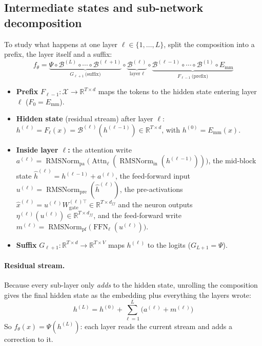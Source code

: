 \documentclass[10pt,a4paper]{article}
\newcommand{\op}[1]{\operatorname{#1}}
\theoremstyle{definition}
\begin{document}
\subsection{Intermediate states and sub-network decomposition}
To study what happens at one layer $\ell\in\{1,\dots,L\}$, split the composition into a prefix, the layer itself and a suffix:
\begin{equation}
  f_\theta = \underbrace{\Psi\circ\mathcal{B}^{(L)}\circ\cdots\circ\mathcal{B}^{(\ell+1)}}_{G_{\ell+1}\ \text{(suffix)}}\circ\underbrace{\mathcal{B}^{(\ell)}}_{\text{layer }\ell}\circ\underbrace{\mathcal{B}^{(\ell-1)}\circ\cdots\circ\mathcal{B}^{(1)}\circ E_{\mathrm{mm}}}_{F_{\ell-1}\ \text{(prefix)}}
\end{equation}
\begin{itemize}
\item \textbf{Prefix} $F_{\ell-1}:\mathcal{X}\to\mathbb{R}^{T\times d}$ maps the tokens to the hidden state entering layer $\ell$ ($F_0=E_{\mathrm{mm}}$).
\item \textbf{Hidden state} (residual stream) after layer $\ell$: $h^{(\ell)}=F_\ell(x)=\mathcal{B}^{(\ell)}(h^{(\ell-1)})\in\mathbb{R}^{T\times d}$, with $h^{(0)}=E_{\mathrm{mm}}(x)$.
\item \textbf{Inside layer $\ell$:} the attention write $a^{(\ell)}=\op{RMSNorm}_{\mathrm{pa}}\big(\op{Attn}_\ell(\op{RMSNorm}_{\mathrm{in}}(h^{(\ell-1)}))\big)$, the mid-block state $\hat h^{(\ell)}=h^{(\ell-1)}+a^{(\ell)}$, the feed-forward input $u^{(\ell)}=\op{RMSNorm}_{\mathrm{pre}}(\hat h^{(\ell)})$, the pre-activations $\hat x^{(\ell)}=u^{(\ell)}W^{(\ell)\top}_{\mathrm{gate}}\in\mathbb{R}^{T\times d_{ff}}$ and the neuron outputs $\eta^{(\ell)}(u^{(\ell)})\in\mathbb{R}^{T\times d_{ff}}$, and the feed-forward write $m^{(\ell)}=\op{RMSNorm}_{\mathrm{pf}}\big(\op{FFN}_\ell(u^{(\ell)})\big)$.
\item \textbf{Suffix} $G_{\ell+1}:\mathbb{R}^{T\times d}\to\mathbb{R}^{T\times V}$ maps $h^{(\ell)}$ to the logits ($G_{L+1}=\Psi$).
\end{itemize}
\paragraph{Residual stream.} Because every sub-layer only \emph{adds} to the hidden state, unrolling the composition gives the final hidden state as the embedding plus everything the layers wrote:
\begin{equation}
  h^{(L)} = h^{(0)} + \sum_{\ell=1}^{L}\big(a^{(\ell)}+m^{(\ell)}\big)
\end{equation}
So $f_\theta(x)=\Psi(h^{(L)})$: each layer reads the current stream and adds a correction to it.
\end{document}
